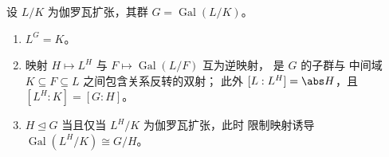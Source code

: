 \begin{theorem}[伽罗瓦理论基本定理]
\label{thm:b3:galois:fundamental}
设 $L/K$ 为伽罗瓦扩张，其群 $G =
\operatorname{Gal}(L/K)$。
\begin{enumerate}
  \item $L^G = K$。
  \item 映射 $H \mapsto L^H$ 与 $F \mapsto
        \operatorname{Gal}(L/F)$ 互为逆映射，
        是 $G$ 的子群与
        中间域 $K \subseteq F \subseteq L$ 之间包含关系反转的双射；
        此外 $[L : L^H] = \abs H$，且 $[L^H : K] = [G : H]$。
  \item $H \trianglelefteq G$ 当且仅当 $L^H/K$ 为伽罗瓦扩张，此时
        限制映射诱导 $\operatorname{Gal}(L^H/K) \cong
        G/H$。
\end{enumerate}
\end{theorem}

